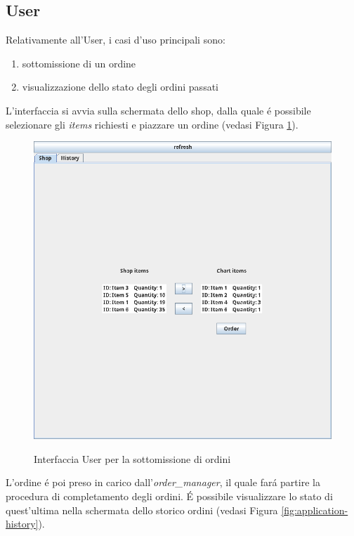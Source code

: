 \subsection{User}
Relativamente all'User, i casi d'uso principali sono:
\begin{enumerate}
    \item sottomissione di un ordine
    \item visualizzazione dello stato degli ordini passati
\end{enumerate}
L'interfaccia si avvia sulla schermata dello shop, dalla quale \'e possibile selezionare gli \textit{items} richiesti e piazzare un ordine (vedasi Figura \ref{fig:application-shop}).
\begin{figure}
    \includegraphics[width=\textwidth]{section/usage_examples/figure/application-shop.png}
    \label{fig:application-shop}
    \caption{Interfaccia User per la sottomissione di ordini}
\end{figure}
L'ordine \'e poi preso in carico dall'\textit{order\_manager}, il quale far\'a partire la procedura di completamento degli ordini. \'E possibile visualizzare lo stato di quest'ultima nella schermata dello storico ordini (vedasi Figura \ref{fig:application-history}).
